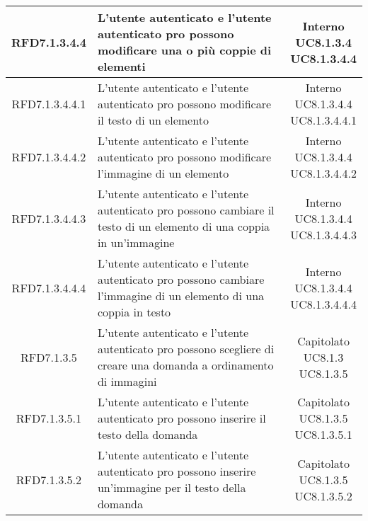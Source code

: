 \begin{longtable}{|c|>{\centering}m{7cm}|c|}
			 \hypertarget{{RFD7.1.3.4.4}}{{RFD7.1.3.4.4}} & L’utente autenticato e l'utente autenticato pro possono modificare una o più coppie di elementi & \makecell{Interno\\ UC8.1.3.4 \\UC8.1.3.4.4 } \\ \hline
			 \hypertarget{{RFD7.1.3.4.4.1}}{{RFD7.1.3.4.4.1}} & L’utente autenticato e l'utente autenticato pro possono modificare il testo di un elemento & \makecell{Interno\\ UC8.1.3.4.4 \\UC8.1.3.4.4.1 } \\ \hline
			 \hypertarget{{RFD7.1.3.4.4.2}}{{RFD7.1.3.4.4.2}} & L’utente autenticato e l'utente autenticato pro possono modificare l’immagine di un elemento & \makecell{Interno\\ UC8.1.3.4.4 \\UC8.1.3.4.4.2 } \\ \hline
			 \hypertarget{{RFD7.1.3.4.4.3}}{{RFD7.1.3.4.4.3}} & L’utente autenticato e l'utente autenticato pro possono cambiare il testo di un elemento di una coppia in un’immagine & \makecell{Interno\\ UC8.1.3.4.4 \\UC8.1.3.4.4.3 } \\ \hline
			 \hypertarget{{RFD7.1.3.4.4.4}}{{RFD7.1.3.4.4.4}} & L’utente autenticato e l'utente autenticato pro possono cambiare l’immagine di un elemento di una coppia in testo & \makecell{Interno\\ UC8.1.3.4.4 \\UC8.1.3.4.4.4 } \\ \hline
			 \hypertarget{{RFD7.1.3.5}}{{RFD7.1.3.5}} & L’utente autenticato e l’utente autenticato pro possono scegliere di creare una domanda a ordinamento di immagini  & \makecell{Capitolato\\ UC8.1.3 \\UC8.1.3.5 } \\ \hline
			 \hypertarget{{RFD7.1.3.5.1}}{{RFD7.1.3.5.1}} & L’utente autenticato e l’utente autenticato pro possono inserire il testo della domanda & \makecell{Capitolato\\ UC8.1.3.5 \\UC8.1.3.5.1 } \\ \hline
			 \hypertarget{{RFD7.1.3.5.2}}{{RFD7.1.3.5.2}} & L’utente autenticato e l’utente autenticato pro possono inserire un'immagine per il testo della domanda & \makecell{Capitolato\\ UC8.1.3.5 \\UC8.1.3.5.2 } \\ \hline

\end{longtable}
